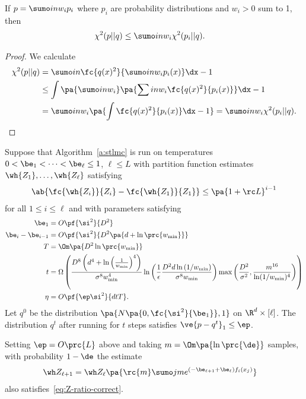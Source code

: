 \begin{lem}\label{lem:chi-sq-mixture}
If $p=\sumo in w_i p_i$ where $p_i$ are probability distributions and $w_i>0$ sum to 1, then 
\begin{align}
\chi^2(p||q) &\le \sumo in w_i \chi^2(p_i||q).
\end{align}
\end{lem}
\begin{proof}
We calculate 
\begin{align}
\chi^2(p||q)&=\sumo in \fc{q(x)^2}{\sumo in w_ip_i(x)} \dx -1\\
&\le \int  \pa{\sumo in w_i}\pa{\sum in w_i\fc{q(x)^2}{p_i(x)}}\dx -1\\
& = \sumo in w_i\pa{\int \fc{q(x)^2}{p_i(x)}\dx-1} = \sumo in w_i \chi^2(p_i||q).
\end{align}
\end{proof}

\begin{lem}\label{lem:a1-correct}
Suppose that Algorithm~\ref{a:stlmc} is run on temperatures $0<\be_1<\cdots< \be_\ell\le 1$, $\ell\le L$ with partition function estimates $\wh{Z_1},\ldots, \wh{Z_\ell}$ satisfying
\begin{align}\label{eq:Z-ratio-correct}
\ab{\fc{\wh{Z_i}}{Z_i} - \fc{\wh{Z_1}}{Z_1}}\le \pa{1+\rc L}^{i-1}
\end{align} 
for all $1\le i\le \ell$
and with parameters satisfying
\begin{align}
\label{eq:beta1}
\be_1 &= O\pf{\si^2}{D^2}\\
\label{eq:beta-diff}
\be_i-\be_{i-1} &= 
O\pf{\si^2}{D^2\pa{d+\ln \prc{w_{\min}}}}\\
T&=\Om\pa{D^2\ln \prc{w_{\min}}}\\
t&=\Omega \left(\frac{D^8 \left(d^4 + \ln\left(\frac{1}{w_{\min}}\right)^4 \right)}{\sigma^8 w^4_{\min}} \ln\left(\frac{1}{\epsilon} \frac{D^2 d \ln\left(1/w_{\min}\right)}{\sigma^8 w_{\min}}\right) \max\left(\frac{D^2}{\sigma^2}, \frac{m^{16}}{\ln(1/w_{\min})^4}\right)\right)\\
\eta &= %
O\pf{\ep \si^2}{dtT}.
\end{align}
Let $q^0$ be the distribution $\pa{N\pa{0,\fc{\si^2}{\be_1}}, 1}$ on $\R^d\times [\ell]$. 
The distribution $q^t$ after running for $t$ steps satisfies $
\ve{p-q^t}_1\le \ep
$.

Setting $\ep = O\prc{L}$ above and taking $m=\Om\pa{\ln \prc{\de}}$ samples, with probability $1-\de$ the estimate 
\begin{align}\wh Z_{\ell+1}&=
\wh Z_\ell \pa{\rc{m}\sumo jm e^{(-\be_{\ell+1} + \be_\ell)f_i(x_j)}}
\end{align} also satisfies~\eqref{eq:Z-ratio-correct}.
\end{lem}


